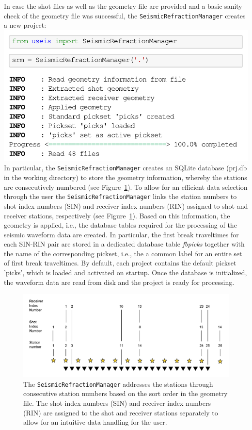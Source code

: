 \documentclass[a4paper,fleqn]{cas-sc}
\begin{document}
In case the shot files as well as the geometry file are provided and a basic sanity check of the geometry file was successful, the \texttt{SeismicRefractionManager} creates a new project:
\newline
\includegraphics[width=.5\textwidth]{./figures/create_project.pdf}
\newline
In particular, the \texttt{SeismicRefractionManager} creates an SQLite database (prj.db in the working directory) to store the geometry information, whereby the stations are consecutively numbered (see Figure~\ref{fig:statnum}). To allow for an efficient data selection through the user the \texttt{SeismicRefractionManager} links the station numbers to shot index numbers (SIN) and receiver index numbers (RIN) assigned to shot and receiver stations, respectively (see Figure~\ref{fig:statnum}). Based on this information, the geometry is applied, i.e., the database tables required for the processing of the seismic waveform data are created.
In particular, the first break traveltimes for each SIN-RIN pair are stored in a dedicated database table \textit{fbpicks} together with the name of the corresponding pickset, i.e., the a common label for an entire set of first break traveltimes. By default, each project contains the default pickset 'picks', which is loaded and activated on startup. Once the database is initialized, the waveform data are read from disk and the project is ready for processing.
\begin{figure}
	\centering
	\includegraphics[width=.75\textwidth]{figures/station_numbering.pdf}
	\caption{The \texttt{SeismicRefractionManager} addresses the stations through consecutive station numbers based on the sort order in the geometry file. The shot index numbers (SIN) and receiver index numbers (RIN) are assigned to the shot and receiver stations separately to allow for an intuitive data handling for the user.}
	\label{fig:statnum}
\end{figure}
\end{document}
